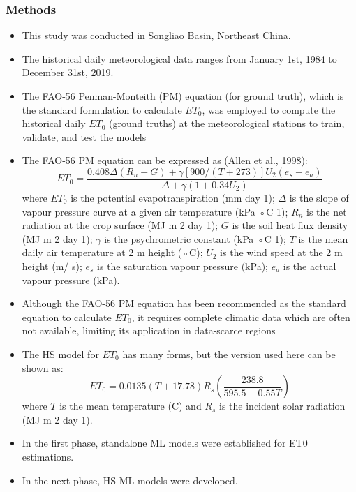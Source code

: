 \documentclass[paper=a4, fontsize=12pt]{scrartcl}
\begin{document}
	\subsubsection{Methods}
	\begin{itemize}
		\item This study was conducted in Songliao Basin, Northeast China.
		\item The historical daily meteorological data ranges from January 1st, 1984 to December 31st, 2019.
		\item The FAO-56 Penman-Monteith (PM) equation (for ground truth), which is the standard formulation to calculate $ET_0$, was employed to compute the historical daily $ET_0$ (ground truths) at the meteorological stations to train, validate, and test the models
		\item The FAO-56 PM equation can be expressed as (Allen et al., 1998):\\
		\begin{equation}
			ET_0 = \frac{0.408\Delta(R_n - G) + \gamma[900/(T + 273)]U_2(e_s - e_a)}{\Delta + \gamma(1 + 0.34U_2)}
		\end{equation}
		where $ET_0$ is the potential evapotranspiration (mm day 1); $\Delta$ is the slope  of vapour pressure curve at a given air temperature (kPa ◦C 1); $R_n$ is the  net radiation at the crop surface (MJ m 2 day 1); $G$ is the soil heat flux  density (MJ m 2 day 1); $\gamma$ is the psychrometric constant (kPa ◦C 1); $T$ is the mean daily air temperature at 2 m height (◦C); $U_2$ is the wind speed at the 2 m height (m/ s); $e_s$ is the saturation vapour pressure (kPa); $e_a$ is the actual vapour pressure (kPa).
		\item Although the FAO-56 PM equation has been recommended as the standard equation to calculate $ET_0$, it requires complete climatic data which are often not available, limiting its application in data-scarce regions
		\item The HS model for $ET_0$ has many forms, but the version used here can be shown as:\\
		\begin{equation}
			ET_0 = 0.0135(T + 17.78)R_s\left(\frac{238.8}{595.5 - 0.55T}\right)
			\label{eqn:hs}
		\end{equation}
		where $T$ is the mean temperature (C) and $R_s$ is the incident solar radiation (MJ m 2 day 1).
		\item In the first phase, standalone ML models were established for ET0 estimations.
		\item In the next phase, HS-ML models were developed.

\end{itemize}
\end{document}

